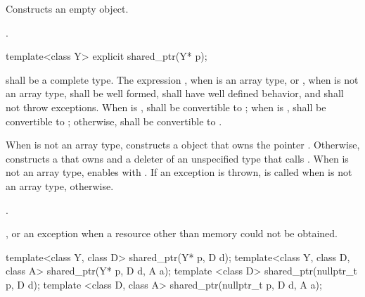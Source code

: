 \begin{itemdescr}
\pnum\effects  Constructs an empty  object.

\pnum\postconditions  {}.
\end{itemdescr}

%
\begin{itemdecl}
template<class Y> explicit shared_ptr(Y* p);
\end{itemdecl}

\begin{itemdescr}
\pnum\requires {} shall be a complete type. The expression
, when  is an array type, or
, when  is not an array type,
shall be well formed, shall have well defined behavior, and
shall not throw exceptions.
When  is ,  shall be convertible to ;
when  is ,  shall be convertible to ;
otherwise,  shall be convertible to .

\pnum\effects When  is not an array type,
constructs a  object
that owns the pointer .
Otherwise, constructs a 
that owns  and a deleter of an
unspecified type that calls .
When  is not an array type,
enables  with .
If an exception is thrown,  is called
when  is not an array type,  otherwise.

\pnum\postconditions  {}.

\pnum\throws {}, or an  exception when a resource other than memory could not be obtained.
\end{itemdescr}

%
\begin{itemdecl}
template<class Y, class D> shared_ptr(Y* p, D d);
template<class Y, class D, class A> shared_ptr(Y* p, D d, A a);
template <class D> shared_ptr(nullptr_t p, D d);
template <class D, class A> shared_ptr(nullptr_t p, D d, A a);
\end{itemdecl}

